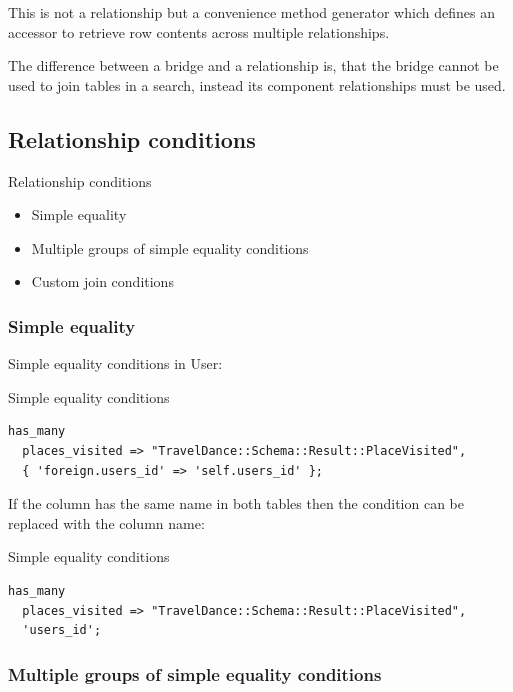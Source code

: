 This is not a relationship but a convenience method generator which defines an
accessor to retrieve row contents across multiple relationships.

The difference between a bridge and a relationship is, that the bridge
cannot be used to join tables in a search, instead its component
relationships must be used.

\subsection{Relationship conditions}

\begin{frame}{Relationship conditions}
\begin{itemize}
\item Simple equality
\item Multiple groups of simple equality conditions
\item Custom join conditions
\end{itemize}
\end{frame}

\subsubsection{Simple equality}

Simple equality conditions
in User:

\begin{frame}[fragile]{Simple equality conditions}
\begin{lstlisting}
has_many
  places_visited => "TravelDance::Schema::Result::PlaceVisited",
  { 'foreign.users_id' => 'self.users_id' };
\end{lstlisting}
\end{frame}

If the column has the same name in both tables then the condition can be replaced with the column name:

\begin{frame}[fragile]{Simple equality conditions}
\begin{lstlisting}
has_many
  places_visited => "TravelDance::Schema::Result::PlaceVisited",
  'users_id';
\end{lstlisting}
\end{frame}

\subsubsection{Multiple groups of simple equality conditions}

